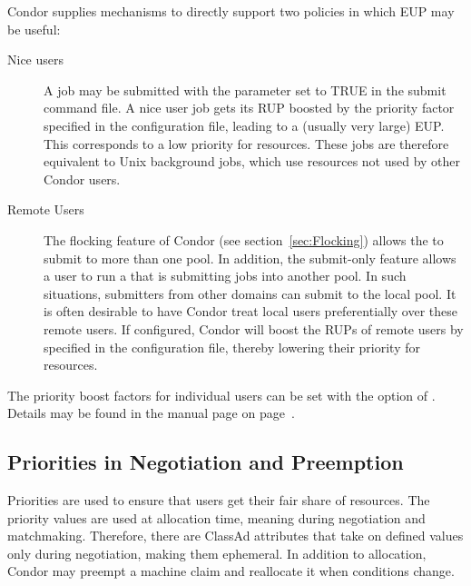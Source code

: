 
Condor supplies mechanisms to directly support two policies in which EUP may
be useful:
\begin{description}
	\item[Nice users]  A job may be submitted with the parameter 
	 set to TRUE in the submit command file.
	A nice user job gets its RUP boosted by the 
	 priority factor specified in the 
	configuration file, leading to a (usually very large) EUP.
	This corresponds to a low priority for resources.
	These jobs are therefore equivalent to Unix background jobs,
	which use resources not used by other Condor users.

	\item[Remote Users] The flocking feature of Condor (see
	section~\ref{sec:Flocking}) allows the  to
	submit to more than one pool.
	In addition, the submit-only feature allows a user to run a
	 that is submitting jobs into another pool.
	In such situations, submitters from other domains
	can submit to the local pool.
	It is often desirable to have Condor treat local users
	preferentially over these remote users.
	If configured, Condor will boost the RUPs of remote users by
	specified in the configuration file,
	thereby lowering their priority for resources.
\end{description}

The priority boost factors for individual users can be set with the 
 option of .
Details may be found in the  manual page 
on page~\pageref{man-condor-userprio}.


\subsection{Priorities in Negotiation and Preemption}
Priorities are used to ensure that users get their fair share of resources.  
The priority values are used at allocation time, meaning during
negotiation and matchmaking.
Therefore, there are ClassAd attributes that take on defined values
only during negotiation, making them ephemeral.
In addition to allocation, Condor may preempt a machine claim 
and reallocate it when conditions change.

